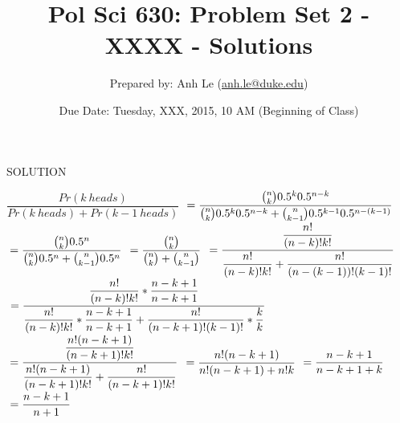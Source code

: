 \documentclass[12pt,letter]{article}\usepackage[]{graphicx}\usepackage[]{color}
\begin{document}
\title{Pol Sci 630: Problem Set 2 - XXXX - Solutions}

\author{Prepared by: Anh Le (\href{mailto:anh.le@duke.edu}{anh.le@duke.edu})}

\date{Due Date: Tuesday, XXX, 2015, 10 AM (Beginning of Class)}
 
\maketitle 


SOLUTION

$\dfrac{Pr(k\ heads)}{Pr (k\ heads) + Pr (k-1\ heads)}$
$\\ = \dfrac{\binom{n}{k}0.5^k0.5^{n-k}}{\binom{n}{k}0.5^k0.5^{n-k} + \binom{n}{k-1}0.5^{k-1}0.5^{n-(k-1)}}$
$\\ = \dfrac{\binom{n}{k}0.5^n}{\binom{n}{k}0.5^n + \binom{n}{k-1}0.5^n}$
$ \\ = \dfrac{\binom{n}{k}}{\binom{n}{k} + \binom{n}{k-1}}$
$\\ = \dfrac{\dfrac{n!}{(n-k)! k!}}{\dfrac{n!}{(n-k)! k!} + \dfrac{n!}{(n-(k-1))! (k-1)!}}$
$\\ = \dfrac{\dfrac{n!}{(n-k)! k!} * \dfrac{n-k+1}{n-k+1}}{\dfrac{n!}{(n-k)! k!} * \dfrac{n-k+1}{n-k+1} + \dfrac{n!}{(n-k+1)! (k-1)!}*\dfrac{k}{k}}$
$\\ = \dfrac{\dfrac{n!(n-k+1)}{(n-k+1)! k!}}{\dfrac{n!(n-k+1)}{(n-k+1)! k!} + \dfrac{n!}{(n-k+1)! k!}}$
$\\ = \dfrac{n!(n-k+1)}{n!(n-k+1)+n!k}$
$\\ = \dfrac{n-k+1}{n-k+1+k}$
$\\= \dfrac{n-k+1}{n+1}$
\end{document}
